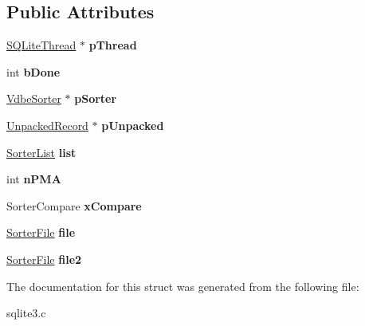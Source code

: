 \subsection*{Public Attributes}
\begin{DoxyCompactItemize}
\item 
\hyperlink{structSQLiteThread}{S\+Q\+Lite\+Thread} $\ast$ {\bfseries p\+Thread}\hypertarget{structSortSubtask_abb534010ac35e0c37e41c26712e7b58c}{}\label{structSortSubtask_abb534010ac35e0c37e41c26712e7b58c}

\item 
int {\bfseries b\+Done}\hypertarget{structSortSubtask_a156fc75053f13e877c36d80885338060}{}\label{structSortSubtask_a156fc75053f13e877c36d80885338060}

\item 
\hyperlink{structVdbeSorter}{Vdbe\+Sorter} $\ast$ {\bfseries p\+Sorter}\hypertarget{structSortSubtask_a2a8ec6b4b0d29090e3b33b1a6647655a}{}\label{structSortSubtask_a2a8ec6b4b0d29090e3b33b1a6647655a}

\item 
\hyperlink{structUnpackedRecord}{Unpacked\+Record} $\ast$ {\bfseries p\+Unpacked}\hypertarget{structSortSubtask_af2312bacbb7e4cbe905eae20a60a3f39}{}\label{structSortSubtask_af2312bacbb7e4cbe905eae20a60a3f39}

\item 
\hyperlink{structSorterList}{Sorter\+List} {\bfseries list}\hypertarget{structSortSubtask_a0a79fd21798a08ceede3febbd08c88a2}{}\label{structSortSubtask_a0a79fd21798a08ceede3febbd08c88a2}

\item 
int {\bfseries n\+P\+MA}\hypertarget{structSortSubtask_a6ecceaeda562346b298aa9fb95355071}{}\label{structSortSubtask_a6ecceaeda562346b298aa9fb95355071}

\item 
Sorter\+Compare {\bfseries x\+Compare}\hypertarget{structSortSubtask_a42bfd224f9e8125c22c2cc66f865d9af}{}\label{structSortSubtask_a42bfd224f9e8125c22c2cc66f865d9af}

\item 
\hyperlink{structSorterFile}{Sorter\+File} {\bfseries file}\hypertarget{structSortSubtask_a077f999ff1e4148e48bd8df25092fd85}{}\label{structSortSubtask_a077f999ff1e4148e48bd8df25092fd85}

\item 
\hyperlink{structSorterFile}{Sorter\+File} {\bfseries file2}\hypertarget{structSortSubtask_a23b46687f7a96ef1052a062f8097234e}{}\label{structSortSubtask_a23b46687f7a96ef1052a062f8097234e}

\end{DoxyCompactItemize}


The documentation for this struct was generated from the following file\+:\begin{DoxyCompactItemize}
\item 
sqlite3.\+c\end{DoxyCompactItemize}
